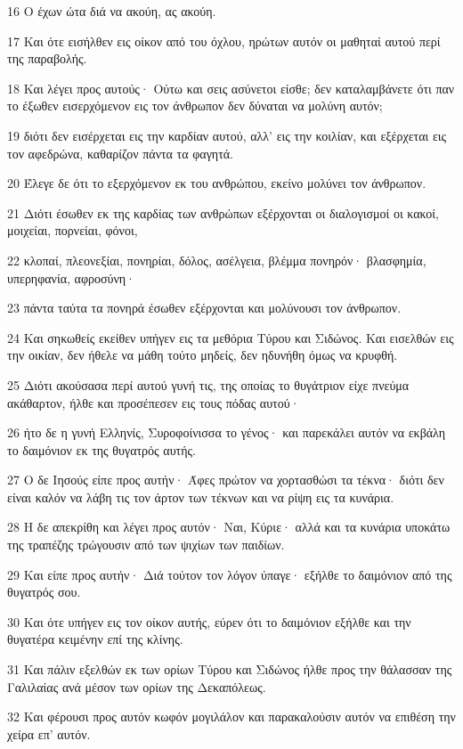 \par 16 Ο έχων ώτα διά να ακούη, ας ακούη.
\par 17 Και ότε εισήλθεν εις οίκον από του όχλου, ηρώτων αυτόν οι μαθηταί αυτού περί της παραβολής.
\par 18 Και λέγει προς αυτούς· Ούτω και σεις ασύνετοι είσθε; δεν καταλαμβάνετε ότι παν το έξωθεν εισερχόμενον εις τον άνθρωπον δεν δύναται να μολύνη αυτόν;
\par 19 διότι δεν εισέρχεται εις την καρδίαν αυτού, αλλ' εις την κοιλίαν, και εξέρχεται εις τον αφεδρώνα, καθαρίζον πάντα τα φαγητά.
\par 20 Έλεγε δε ότι το εξερχόμενον εκ του ανθρώπου, εκείνο μολύνει τον άνθρωπον.
\par 21 Διότι έσωθεν εκ της καρδίας των ανθρώπων εξέρχονται οι διαλογισμοί οι κακοί, μοιχείαι, πορνείαι, φόνοι,
\par 22 κλοπαί, πλεονεξίαι, πονηρίαι, δόλος, ασέλγεια, βλέμμα πονηρόν· βλασφημία, υπερηφανία, αφροσύνη·
\par 23 πάντα ταύτα τα πονηρά έσωθεν εξέρχονται και μολύνουσι τον άνθρωπον.
\par 24 Και σηκωθείς εκείθεν υπήγεν εις τα μεθόρια Τύρου και Σιδώνος. Και εισελθών εις την οικίαν, δεν ήθελε να μάθη τούτο μηδείς, δεν ηδυνήθη όμως να κρυφθή.
\par 25 Διότι ακούσασα περί αυτού γυνή τις, της οποίας το θυγάτριον είχε πνεύμα ακάθαρτον, ήλθε και προσέπεσεν εις τους πόδας αυτού·
\par 26 ήτο δε η γυνή Ελληνίς, Συροφοίνισσα το γένος· και παρεκάλει αυτόν να εκβάλη το δαιμόνιον εκ της θυγατρός αυτής.
\par 27 Ο δε Ιησούς είπε προς αυτήν· Άφες πρώτον να χορτασθώσι τα τέκνα· διότι δεν είναι καλόν να λάβη τις τον άρτον των τέκνων και να ρίψη εις τα κυνάρια.
\par 28 Η δε απεκρίθη και λέγει προς αυτόν· Ναι, Κύριε· αλλά και τα κυνάρια υποκάτω της τραπέζης τρώγουσιν από των ψιχίων των παιδίων.
\par 29 Και είπε προς αυτήν· Διά τούτον τον λόγον ύπαγε· εξήλθε το δαιμόνιον από της θυγατρός σου.
\par 30 Και ότε υπήγεν εις τον οίκον αυτής, εύρεν ότι το δαιμόνιον εξήλθε και την θυγατέρα κειμένην επί της κλίνης.
\par 31 Και πάλιν εξελθών εκ των ορίων Τύρου και Σιδώνος ήλθε προς την θάλασσαν της Γαλιλαίας ανά μέσον των ορίων της Δεκαπόλεως.
\par 32 Και φέρουσι προς αυτόν κωφόν μογιλάλον και παρακαλούσιν αυτόν να επιθέση την χείρα επ' αυτόν.
